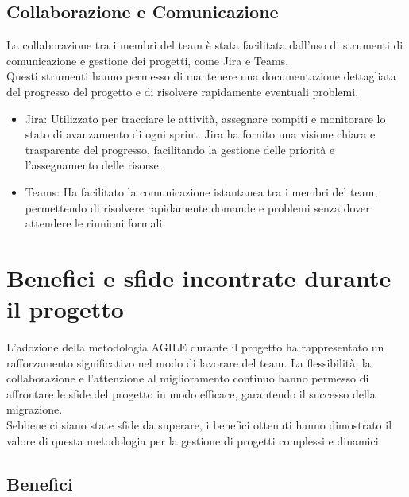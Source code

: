 \subsection{Collaborazione e Comunicazione}
\label{sub:comunicazione}

La collaborazione tra i membri del team è stata facilitata dall'uso di strumenti
di comunicazione e gestione dei progetti, come Jira e Teams.\\ Questi strumenti
hanno permesso di mantenere una documentazione dettagliata del progresso del
progetto e di risolvere rapidamente eventuali problemi.
\begin{itemize}
  \item Jira: Utilizzato per tracciare le attività, assegnare compiti e monitorare
    lo stato di avanzamento di ogni sprint. Jira ha fornito una visione chiara e
    trasparente del progresso, facilitando la gestione delle priorità e l'assegnamento
    delle risorse.

  \item Teams: Ha facilitato la comunicazione istantanea tra i membri del team, permettendo
    di risolvere rapidamente domande e problemi senza dover attendere le riunioni
    formali.
\end{itemize}

\section{Benefici e sfide incontrate durante il progetto}
\label{sec:benefici_sfide_agile}

L'adozione della metodologia AGILE durante il progetto ha rappresentato un rafforzamento
significativo nel modo di lavorare del team. La flessibilità, la collaborazione e
l'attenzione al miglioramento continuo hanno permesso di affrontare le sfide del
progetto in modo efficace, garantendo il successo della migrazione.\\ Sebbene ci
siano state sfide da superare, i benefici ottenuti hanno dimostrato il valore di
questa metodologia per la gestione di progetti complessi e dinamici.

\subsection{Benefici}
\label{sub:benefici}

